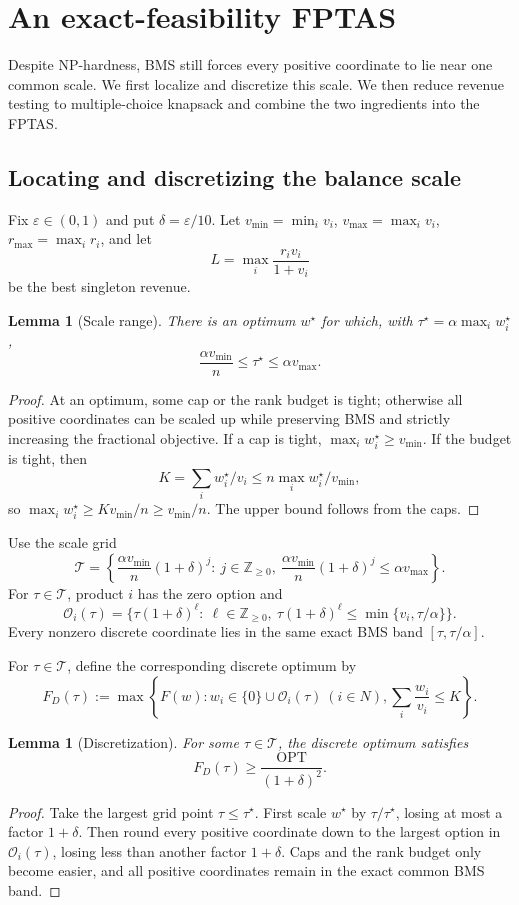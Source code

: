 \documentclass[11pt]{article}
\newtheorem{lemma}[theorem]{Lemma}
\newcommand{\OPT}{\mathrm{OPT}}
\begin{document}
\section{An exact-feasibility FPTAS}\label{sec:fptas}
Despite NP-hardness, BMS still forces every positive coordinate to lie near one common scale. We first localize and discretize this scale. We then reduce revenue testing to multiple-choice knapsack and combine the two ingredients into the FPTAS.

\subsection{Locating and discretizing the balance scale}
Fix $\varepsilon\in(0,1)$ and put $\delta=\varepsilon/10$. Let $v_{\min}=\min_i v_i$, $v_{\max}=\max_i v_i$, $r_{\max}=\max_i r_i$, and let
\[
 L=\max_i\frac{r_iv_i}{1+v_i}
\]
be the best singleton revenue.

\begin{lemma}[Scale range]\label{lem:scale}
There is an optimum $w^\star$ for which, with $\tau^\star=\alpha\max_iw_i^\star$,
\[
 \frac{\alpha v_{\min}}n\le\tau^\star\le\alpha v_{\max}.
\]
\end{lemma}
\begin{proof}
At an optimum, some cap or the rank budget is tight; otherwise all positive coordinates can be scaled up while preserving BMS and strictly increasing the fractional objective. If a cap is tight, $\max_iw_i^\star\ge v_{\min}$. If the budget is tight, then
\[
 K=\sum_iw_i^\star/v_i\le n\max_iw_i^\star/v_{\min},
\]
so $\max_iw_i^\star\ge Kv_{\min}/n\ge v_{\min}/n$. The upper bound follows from the caps.
\end{proof}

Use the scale grid
\[
 \mathcal T=\left\{\frac{\alpha v_{\min}}n(1+\delta)^j:\ j\in\mathbb Z_{\ge0},\ \frac{\alpha v_{\min}}n(1+\delta)^j\le\alpha v_{\max}\right\}.
\]
For $\tau\in\mathcal T$, product $i$ has the zero option and
\[
 \mathcal O_i(\tau)=\{\tau(1+\delta)^\ell:\ \ell\in\mathbb Z_{\ge0},\ \tau(1+\delta)^\ell\le\min\{v_i,\tau/\alpha\}\}.
\]
Every nonzero discrete coordinate lies in the same exact BMS band $[\tau,\tau/\alpha]$.

For $\tau\in\mathcal T$, define the corresponding discrete optimum by
\[
 F_D(\tau):=\max\left\{F(w):
 w_i\in\{0\}\cup\mathcal O_i(\tau)\ (i\in N),
 \sum_i\frac{w_i}{v_i}\le K\right\}.
\]

\begin{lemma}[Discretization]\label{lem:disc}
For some $\tau\in\mathcal T$, the discrete optimum satisfies
\[
 F_D(\tau)\ge\frac{\OPT}{(1+\delta)^2}.
\]
\end{lemma}
\begin{proof}
Take the largest grid point $\tau\le\tau^\star$. First scale $w^\star$ by $\tau/\tau^\star$, losing at most a factor $1+\delta$. Then round every positive coordinate down to the largest option in $\mathcal O_i(\tau)$, losing less than another factor $1+\delta$. Caps and the rank budget only become easier, and all positive coordinates remain in the exact common BMS band.
\end{proof}
\end{document}
